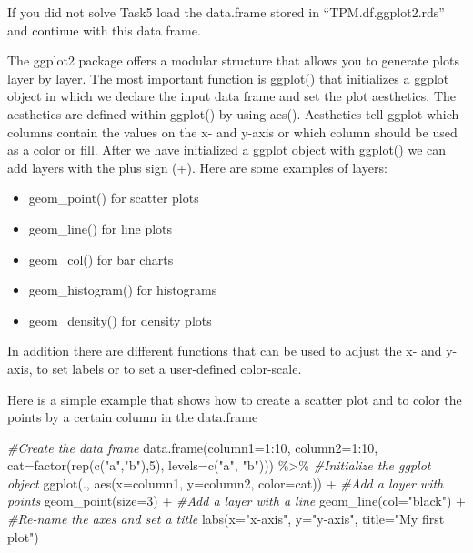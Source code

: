 \documentclass[
  7pt,
]{article}
\newenvironment{Shaded}{\begin{snugshade}}{\end{snugshade}}
\newcommand{\AttributeTok}[1]{\textcolor[rgb]{0.77,0.63,0.00}{#1}}
\newcommand{\CommentTok}[1]{\textcolor[rgb]{0.56,0.35,0.01}{\textit{#1}}}
\newcommand{\DecValTok}[1]{\textcolor[rgb]{0.00,0.00,0.81}{#1}}
\newcommand{\FunctionTok}[1]{\textcolor[rgb]{0.00,0.00,0.00}{#1}}
\newcommand{\NormalTok}[1]{#1}
\newcommand{\SpecialCharTok}[1]{\textcolor[rgb]{0.00,0.00,0.00}{#1}}
\newcommand{\StringTok}[1]{\textcolor[rgb]{0.31,0.60,0.02}{#1}}
\providecommand{\tightlist}{%
  \setlength{\itemsep}{0pt}\setlength{\parskip}{0pt}}
\begin{document}
If you did not solve Task5 load the data.frame stored in
``TPM.df.ggplot2.rds'' and continue with this data frame.

The ggplot2 package offers a modular structure that allows you to
generate plots layer by layer. The most important function is ggplot()
that initializes a ggplot object in which we declare the input data
frame and set the plot aesthetics. The aesthetics are defined within
ggplot() by using aes(). Aesthetics tell ggplot which columns contain
the values on the x- and y-axis or which column should be used as a
color or fill. After we have initialized a ggplot object with ggplot()
we can add layers with the plus sign (+). Here are some examples of
layers:

\begin{itemize}
\tightlist
\item
  geom\_point() for scatter plots
\item
  geom\_line() for line plots
\item
  geom\_col() for bar charts
\item
  geom\_histogram() for histograms
\item
  geom\_density() for density plots
\end{itemize}

In addition there are different functions that can be used to adjust the
x- and y-axis, to set labels or to set a user-defined color-scale.

Here is a simple example that shows how to create a scatter plot and to
color the points by a certain column in the data.frame

\begin{Shaded}
\begin{Highlighting}[]
\CommentTok{\#Create the data frame}
\FunctionTok{data.frame}\NormalTok{(}\AttributeTok{column1=}\DecValTok{1}\SpecialCharTok{:}\DecValTok{10}\NormalTok{, }\AttributeTok{column2=}\DecValTok{1}\SpecialCharTok{:}\DecValTok{10}\NormalTok{, }\AttributeTok{cat=}\FunctionTok{factor}\NormalTok{(}\FunctionTok{rep}\NormalTok{(}\FunctionTok{c}\NormalTok{(}\StringTok{"a"}\NormalTok{,}\StringTok{"b"}\NormalTok{),}\DecValTok{5}\NormalTok{), }\AttributeTok{levels=}\FunctionTok{c}\NormalTok{(}\StringTok{"a"}\NormalTok{, }\StringTok{"b"}\NormalTok{))) }\SpecialCharTok{\%\textgreater{}\%} 
  \CommentTok{\#Initialize the ggplot object}
  \FunctionTok{ggplot}\NormalTok{(., }\FunctionTok{aes}\NormalTok{(}\AttributeTok{x=}\NormalTok{column1, }\AttributeTok{y=}\NormalTok{column2, }\AttributeTok{color=}\NormalTok{cat)) }\SpecialCharTok{+}
  \CommentTok{\#Add a layer with points}
  \FunctionTok{geom\_point}\NormalTok{(}\AttributeTok{size=}\DecValTok{3}\NormalTok{) }\SpecialCharTok{+}
  \CommentTok{\#Add a layer with a line}
  \FunctionTok{geom\_line}\NormalTok{(}\AttributeTok{col=}\StringTok{"black"}\NormalTok{) }\SpecialCharTok{+}
  \CommentTok{\#Re{-}name the axes and set a title}
  \FunctionTok{labs}\NormalTok{(}\AttributeTok{x=}\StringTok{"x{-}axis"}\NormalTok{, }\AttributeTok{y=}\StringTok{"y{-}axis"}\NormalTok{, }\AttributeTok{title=}\StringTok{"My first plot"}\NormalTok{)}
\end{Highlighting}
\end{Shaded}
\end{document}

